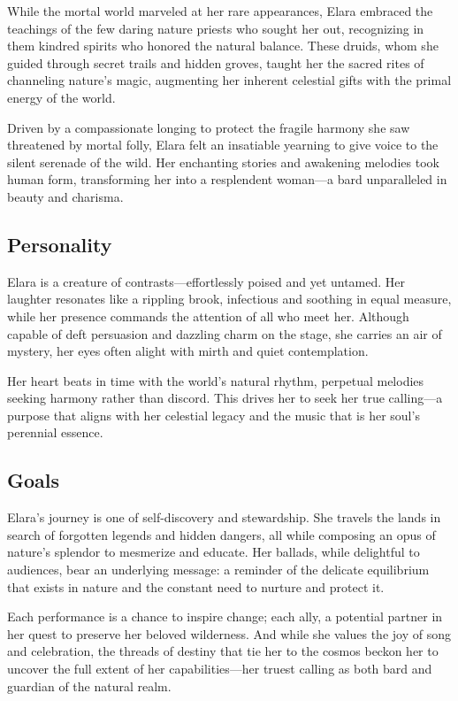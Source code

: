 \documentclass[
  letterpaper,12pt,twoside,twocolumn,openany,
  nodeprecatedcode,bg=full]{dndbook}
\begin{document}
While the mortal world marveled at her rare appearances, Elara embraced
the teachings of the few daring nature priests who sought her out,
recognizing in them kindred spirits who honored the natural balance.
These druids, whom she guided through secret trails and hidden groves,
taught her the sacred rites of channeling nature's magic, augmenting her
inherent celestial gifts with the primal energy of the world.

Driven by a compassionate longing to protect the fragile harmony she saw
threatened by mortal folly, Elara felt an insatiable yearning to give
voice to the silent serenade of the wild. Her enchanting stories and
awakening melodies took human form, transforming her into a resplendent
woman---a bard unparalleled in beauty and charisma.

\subsection{Personality}\label{personality}

Elara is a creature of contrasts---effortlessly poised and yet untamed.
Her laughter resonates like a rippling brook, infectious and soothing in
equal measure, while her presence commands the attention of all who meet
her. Although capable of deft persuasion and dazzling charm on the
stage, she carries an air of mystery, her eyes often alight with mirth
and quiet contemplation.

Her heart beats in time with the world's natural rhythm, perpetual
melodies seeking harmony rather than discord. This drives her to seek
her true calling---a purpose that aligns with her celestial legacy and
the music that is her soul's perennial essence.

\subsection{Goals}\label{goals}

Elara's journey is one of self-discovery and stewardship. She travels
the lands in search of forgotten legends and hidden dangers, all while
composing an opus of nature's splendor to mesmerize and educate. Her
ballads, while delightful to audiences, bear an underlying message: a
reminder of the delicate equilibrium that exists in nature and the
constant need to nurture and protect it.

Each performance is a chance to inspire change; each ally, a potential
partner in her quest to preserve her beloved wilderness. And while she
values the joy of song and celebration, the threads of destiny that tie
her to the cosmos beckon her to uncover the full extent of her
capabilities---her truest calling as both bard and guardian of the
natural realm.
\end{document}

